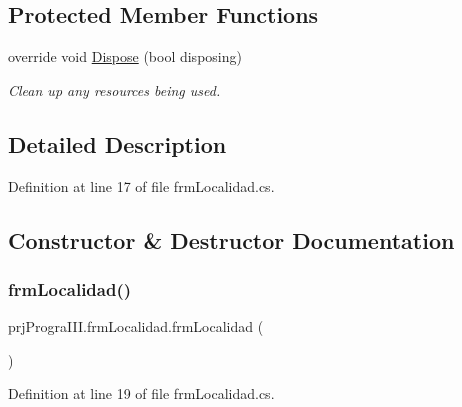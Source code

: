 \subsection*{Protected Member Functions}
\begin{DoxyCompactItemize}
\item 
override void \hyperlink{classprj_progra_i_i_i_1_1frm_localidad_ad30abf0e0173efdd69cacb3f1deba093}{Dispose} (bool disposing)
\begin{DoxyCompactList}\small\item\em Clean up any resources being used. \end{DoxyCompactList}\end{DoxyCompactItemize}


\subsection{Detailed Description}


Definition at line 17 of file frm\+Localidad.\+cs.



\subsection{Constructor \& Destructor Documentation}
\hypertarget{classprj_progra_i_i_i_1_1frm_localidad_ad5a3af80840dc9ea53d5bddc347a61eb}{}\label{classprj_progra_i_i_i_1_1frm_localidad_ad5a3af80840dc9ea53d5bddc347a61eb} 
\subsubsection{\texorpdfstring{frm\+Localidad()}{frmLocalidad()}}
{\footnotesize\ttfamily prj\+Progra\+I\+I\+I.\+frm\+Localidad.\+frm\+Localidad (\begin{DoxyParamCaption}{ }\end{DoxyParamCaption})}



Definition at line 19 of file frm\+Localidad.\+cs.

